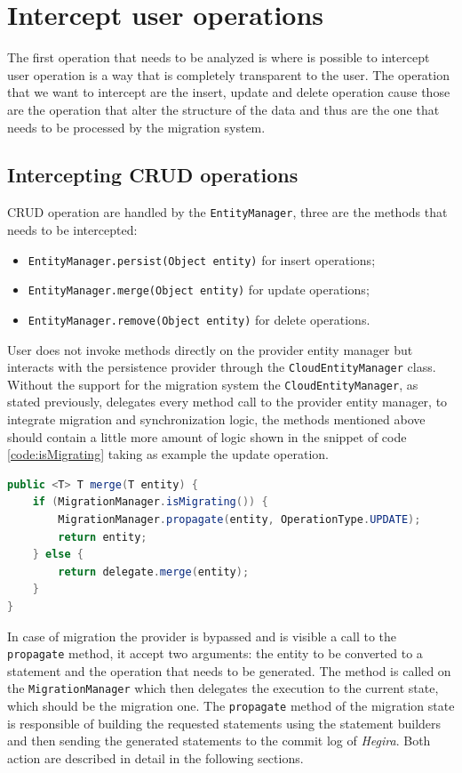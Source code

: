 \section{Intercept user operations}
The first operation that needs to be analyzed is where is possible to intercept user operation is a way that is completely transparent to the user.
The operation that we want to intercept are the insert, update and delete operation cause those are the operation that alter the structure of the data and thus are the one that needs to be processed by the migration system.

\subsection{Intercepting CRUD operations}
CRUD operation are handled by the \texttt{EntityManager}, three are the methods that needs to be intercepted:
\begin{itemize}
\item \texttt{EntityManager.persist(Object entity)} for insert operations;
\item \texttt{EntityManager.merge(Object entity)} for update operations;
\item \texttt{EntityManager.remove(Object entity)} for delete operations.
\end{itemize}
\noindent User does not invoke methods directly on the provider entity manager but interacts with the persistence provider through the \texttt{CloudEntityManager} class. Without the support for the migration system the \texttt{CloudEntityManager}, as stated previously, delegates every method call to the provider entity manager, to integrate migration and synchronization logic, the methods mentioned above should contain a little more amount of logic shown in the snippet of code \ref{code:isMigrating} taking as example the update operation.

\begin{lstlisting}[language=Java, caption=Integrate migration logic, label=code:isMigrating]
public <T> T merge(T entity) {
    if (MigrationManager.isMigrating()) {
        MigrationManager.propagate(entity, OperationType.UPDATE);
        return entity;
    } else {
        return delegate.merge(entity);
    }
}
\end{lstlisting}

\noindent In case of migration the provider is bypassed and is visible a call to the \texttt{propagate} method, it accept two arguments: the entity to be converted to a statement and the operation that needs to be generated. The method is called on the \texttt{MigrationManager} which then delegates the execution to the current state, which should be the migration one. The \texttt{propagate} method of the migration state is responsible of building the requested statements using the statement builders and then sending the generated statements to the commit log of \textit{Hegira}. Both action are described in detail in the following sections.

